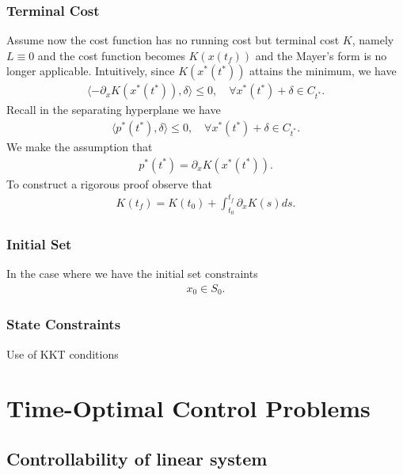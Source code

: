 \documentclass[a4paper,11pt,fleqn]{book}
\theoremstyle{definition}
\theoremstyle{remark}
\begin{document}
\subsubsection{Terminal Cost}
Assume now the cost function has no running cost but terminal cost $K$, namely $L \equiv 0$ and the cost function becomes $K(x(t_f))$ and the Mayer's form is no longer applicable. Intuitively, since $K(x^*(t^*))$ attains the minimum, we have
\begin{align*}
	\langle -\partial_x K(x^*(t^*)) , \delta \rangle \le 0, \quad \forall x^*(t^*) + \delta \in C_{t^*}. 
\end{align*}
Recall in the separating hyperplane we have
\begin{align*}
	\langle p^*(t^*), \delta \rangle \le 0, \quad \forall x^*(t^*) + \delta \in C_{t^*}. 
\end{align*}
We make the assumption that 
\begin{align*}
	p^*(t^*) = \partial_x K(x^*(t^*)). 
\end{align*}
To construct a rigorous proof observe that
\begin{align*}
	K(t_f) = K(t_0) + \int_{t_0}^{t_f} \partial_x K (s) ds. 
\end{align*}


\subsubsection{Initial Set}
In the case where we have the initial set constraints 
\begin{align*}
	x_0 \in S_0. 
\end{align*}

\subsubsection{State Constraints}
Use of KKT conditions



\section{Time-Optimal Control Problems}
\subsection{Controllability of linear system}
\end{document}
